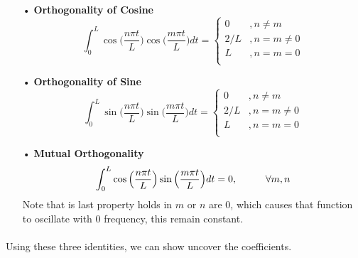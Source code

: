 \documentclass[12pt,letterpaper]{article}
\begin{document}
\begin{enumerate}
\item[•]\textbf{Orthogonality of Cosine}
\begin{equation}
\label{cos orth}
\int_{0}^{L} \cos\Big(\frac{n\pi t}{L}\Big) \cos\Big(\frac{m\pi t}{L}\Big) dt = 
	\left\{
        \begin{array}{ll}
            0 	&, n \neq m \\
            2/L	&, n = m \neq 0 \\
            L 	&, n = m = 0\\
        \end{array}
    \right.
\end{equation}
\item[•]\textbf{Orthogonality of Sine}
\begin{equation}
\label{sin orth}
\int_{0}^{L} \sin\Big(\frac{n\pi t}{L}\Big) \sin\Big(\frac{m\pi t}{L}\Big) dt = 
	\left\{
        \begin{array}{ll}
            0 	&, n \neq m \\
            2/L	&, n = m \neq 0 \\
            L 	&, n = m = 0\\
        \end{array}
    \right.
\end{equation}
\item[•]\textbf{Mutual Orthogonality}
\begin{equation}
\label{mutual orth}
\int_{0}^{L} \cos\Big(\frac{n\pi t}{L}\Big) \sin\Big(\frac{m\pi t}{L}\Big) dt = 0 ,
\hspace*{1cm} \forall m,n
\end{equation}
Note that is last property holds in $m$ or $n$ are $0$, which causes that function to oscillate with $0$ frequency, this remain constant.
\end{enumerate}
\paragraph*{}Using these three identities, we can show uncover the coefficients.







\end{document}
